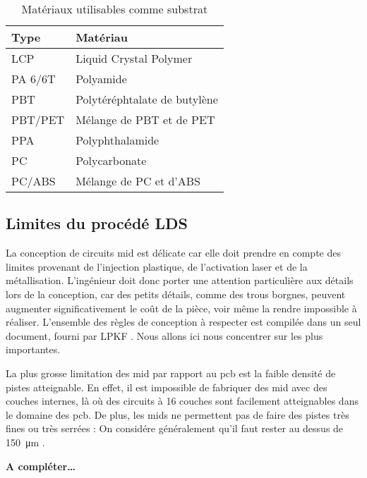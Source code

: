 \begin{table}[h]
\centering
\begin{tabular}{l l}
\toprule 
Type & Matériau \\
\midrule %
LCP & Liquid Crystal Polymer \\
PA 6/6T & Polyamide \\
PBT & Polytéréphtalate de butylène \\
PBT/PET & Mélange de PBT et de PET \\
PPA & Polyphthalamide \\
PC & Polycarbonate \\
PC/ABS & Mélange de PC et d'ABS \\ 
\bottomrule 
\end{tabular}
\caption{Matériaux utilisables comme substrat}
\label{tab:mid-materials}
\end{table}

\subsection{Limites du procédé LDS}
La conception de circuits \gls{mid} est délicate car elle doit prendre en compte des limites provenant de l'injection plastique, de l'activation laser et de la métallisation.
L'ingénieur doit donc porter une attention particulière aux détails lors de la conception, car des petits détails, comme des trous borgnes, peuvent augmenter significativement le coût de la pièce, voir même la rendre impossible à réaliser.
L'ensemble des règles de conception à respecter est compilée dans un seul document, fourni par LPKF \cite{mid-design-rules}.
Nous allons ici nous concentrer sur les plus importantes.

La plus grosse limitation des \gls{mid} par rapport au \gls{pcb} est la faible densité de pistes atteignable.
En effet, il est impossible de fabriquer des \gls{mid} avec des couches internes, là où des circuits à 16 couches sont facilement atteignables dans le domaine des \gls{pcb}.
De plus, les \glspl{mid} ne permettent pas de faire des pistes très fines ou très serrées : On considére généralement qu'il faut rester au dessus de \SI{150}{\micro\meter} .

\textbf{A compléter\ldots}


